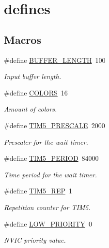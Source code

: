 \hypertarget{group___global}{}\section{defines}
\label{group___global}
\subsection*{Macros}
\begin{DoxyCompactItemize}
\item 
\#define \mbox{\hyperlink{group___global_gaf7b7dc9a200cb1404c280bd500fd1551}{B\+U\+F\+F\+E\+R\+\_\+\+L\+E\+N\+G\+TH}}~100
\begin{DoxyCompactList}\small\item\em Input buffer length. \end{DoxyCompactList}\item 
\#define \mbox{\hyperlink{group___global_ga883046b8f0d1f6368a9b9eaf5ca36af3}{C\+O\+L\+O\+RS}}~16
\begin{DoxyCompactList}\small\item\em Amount of colors. \end{DoxyCompactList}\item 
\#define \mbox{\hyperlink{group___global_ga9ecaf0e0a354195972f9b06cb0015015}{T\+I\+M5\+\_\+\+P\+R\+E\+S\+C\+A\+LE}}~2000
\begin{DoxyCompactList}\small\item\em Prescaler for the wait timer. \end{DoxyCompactList}\item 
\#define \mbox{\hyperlink{group___global_ga65e936fdf6c71ac414036aa74021d04e}{T\+I\+M5\+\_\+\+P\+E\+R\+I\+OD}}~84000
\begin{DoxyCompactList}\small\item\em Time period for the wait timer. \end{DoxyCompactList}\item 
\#define \mbox{\hyperlink{group___global_gada3b8f73ebbcfb8b7a96674900961880}{T\+I\+M5\+\_\+\+R\+EP}}~1
\begin{DoxyCompactList}\small\item\em Repetition counter for T\+I\+M5. \end{DoxyCompactList}\item 
\#define \mbox{\hyperlink{group___global_ga9b470dff68ba3321209a33edc4638bd8}{L\+O\+W\+\_\+\+P\+R\+I\+O\+R\+I\+TY}}~0
\begin{DoxyCompactList}\small\item\em N\+V\+IC priority value. \end{DoxyCompactList}\item 

\end{DoxyCompactItemize}
